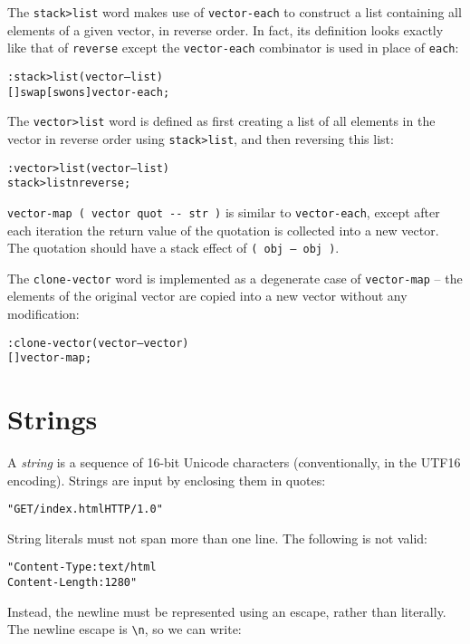 \documentclass[english]{article}
\begin{document}
The \texttt{stack>list} word makes use of \texttt{vector-each} to construct a list containing all elements of a given vector, in reverse order. In fact, its definition looks exactly like that of \texttt{reverse} except the \texttt{vector-each} combinator is used in place of \texttt{each}:

\begin{alltt}
: stack>list ( vector -- list )
    {[} {]} swap {[} swons {]} vector-each ;
\end{alltt}

The \texttt{vector>list} word is defined as first creating a list of all elements in the vector in reverse order using \texttt{stack>list}, and then reversing this list:

\begin{alltt}
: vector>list ( vector -- list )
    stack>list nreverse ;
\end{alltt}

\texttt{vector-map ( vector quot -{}- str )} is similar to \texttt{vector-each}, except after each iteration the return value of the quotation is collected into a new vector. The quotation should have a stack effect of \texttt{( obj -- obj )}.

The \texttt{clone-vector} word is implemented as a degenerate case of \texttt{vector-map} -- the elements of the original vector are copied into a new vector without any modification:

\begin{alltt}
: clone-vector ( vector -- vector )
    {[} {]} vector-map ;
\end{alltt}

\section{Strings}

A \emph{string} is a sequence of 16-bit Unicode characters (conventionally,
in the UTF16 encoding). Strings are input by enclosing them in quotes:

\begin{alltt}
"GET /index.html HTTP/1.0"
\end{alltt}
String literals must not span more than one line. The following is
not valid:

\begin{alltt}
"Content-Type: text/html
Content-Length: 1280"
\end{alltt}
Instead, the newline must be represented using an escape, rather than
literally. The newline escape is \texttt{\textbackslash{}n}, so we
can write:
\end{document}
